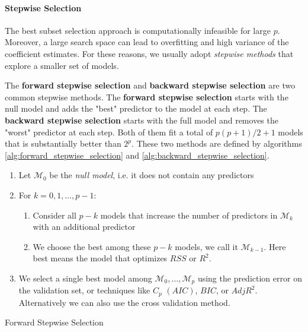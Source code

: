 \paragraph*{Stepwise Selection}
The best subset selection approach is computationally infeasible for large $p$. Moreover, a large search space can lead to overfitting and high variance of the coefficient estimates. For these reasons, we usually adopt \textit{stepwise methods} that explore a smaller set of models.

The \textbf{forward stepwise selection} and \textbf{backward stepwise selection} are two common stepwise methods. The \textbf{forward stepwise selection} starts with the null model and adds the "best" predictor to the model at each step. The \textbf{backward stepwise selection} starts with the full model and removes the "worst" predictor at each step. Both of them fit a total of $p(p+1)/2 + 1$ models that is substantially better than $2^p$. These two methods are defined by algorithms \ref{alg:forward_stepwise_selection} and \ref{alg:backward_stepwise_selection}.
\begin{algorithm}
    \begin{enumerate}
        \item Let $\mathcal M_0$ be the \textit{null model}, i.e. it does not contain any predictors
        \item For $k=0,1,\dots,p-1$:
        \begin{enumerate}
            \item Consider all $p-k$ models that increase the number of predictors in $\mathcal M_k$ with an additional predictor
            \item We choose the best among these $p-k$ models, we call it $\mathcal M_{k-1}$. Here best means the model that optimizes $RSS$ or $R^2$.
        \end{enumerate}
        \item We select a single best model among $\mathcal M_0,\dots,\mathcal M_p$ using the prediction error on the validation set, or techniques like $C_p$ $(AIC)$, $BIC$, or $ AdjR^2$. Alternatively we can also use the cross validation method.
    \end{enumerate}
    \caption{Forward Stepwise Selection}
    \label{alg:forward_stepwise_selection}
\end{algorithm}

